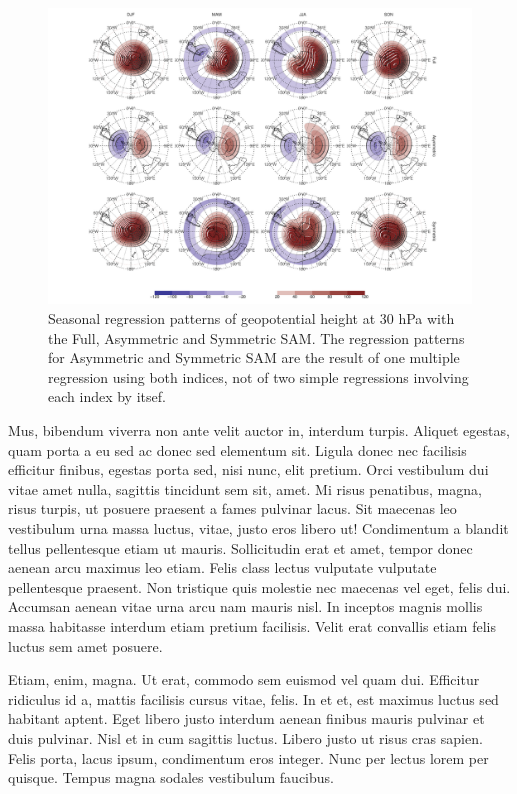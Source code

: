 \documentclass[twocol]{ametsocV5}
\begin{document}
\begin{figure}
\includegraphics{2d-regr-30-1} \caption[Seasonal regression patterns of geopotential height at 30 hPa with the Full, Asymmetric and Symmetric SAM]{Seasonal regression patterns of geopotential height at 30 hPa with the Full, Asymmetric and Symmetric SAM. The regression patterns for Asymmetric and Symmetric SAM are the result of one multiple regression using both indices, not of two simple regressions involving each index by itsef.}\label{fig:2d-regr-30}
\end{figure}

Mus, bibendum viverra non ante velit auctor in, interdum turpis. Aliquet
egestas, quam porta a eu sed ac donec sed elementum sit. Ligula donec
nec facilisis efficitur finibus, egestas porta sed, nisi nunc, elit
pretium. Orci vestibulum dui vitae amet nulla, sagittis tincidunt sem
sit, amet. Mi risus penatibus, magna, risus turpis, ut posuere praesent
a fames pulvinar lacus. Sit maecenas leo vestibulum urna massa luctus,
vitae, justo eros libero ut! Condimentum a blandit tellus pellentesque
etiam ut mauris. Sollicitudin erat et amet, tempor donec aenean arcu
maximus leo etiam. Felis class lectus vulputate vulputate pellentesque
praesent. Non tristique quis molestie nec maecenas vel eget, felis dui.
Accumsan aenean vitae urna arcu nam mauris nisl. In inceptos magnis
mollis massa habitasse interdum etiam pretium facilisis. Velit erat
convallis etiam felis luctus sem amet posuere.

Etiam, enim, magna. Ut erat, commodo sem euismod vel quam dui. Efficitur
ridiculus id a, mattis facilisis cursus vitae, felis. In et et, est
maximus luctus sed habitant aptent. Eget libero justo interdum aenean
finibus mauris pulvinar et duis pulvinar. Nisl et in cum sagittis
luctus. Libero justo ut risus cras sapien. Felis porta, lacus ipsum,
condimentum eros integer. Nunc per lectus lorem per quisque. Tempus
magna sodales vestibulum faucibus.
\end{document}
